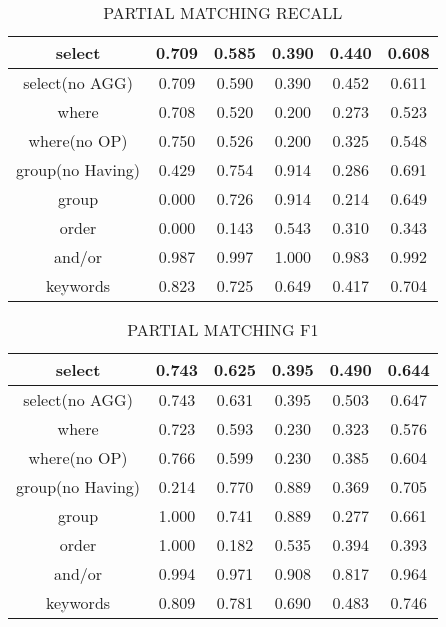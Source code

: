 \begin{table}[h!]
    \centering
    \begin{tabular}{|c|c|c|c|c|c|}
        \hline
        select           & 0.709 & 0.585 & 0.390 & 0.440 & 0.608 \\ \hline
        select(no AGG)   & 0.709 & 0.590 & 0.390 & 0.452 & 0.611 \\ \hline
        where            & 0.708 & 0.520 & 0.200 & 0.273 & 0.523 \\ \hline
        where(no OP)     & 0.750 & 0.526 & 0.200 & 0.325 & 0.548 \\ \hline
        group(no Having) & 0.429 & 0.754 & 0.914 & 0.286 & 0.691 \\ \hline
        group            & 0.000 & 0.726 & 0.914 & 0.214 & 0.649 \\ \hline
        order            & 0.000 & 0.143 & 0.543 & 0.310 & 0.343 \\ \hline
        and/or           & 0.987 & 0.997 & 1.000 & 0.983 & 0.992 \\ \hline

        keywords         & 0.823 & 0.725 & 0.649 & 0.417 & 0.704 \\ \hline
    \end{tabular}
    \caption{PARTIAL MATCHING RECALL }

\end{table}

\begin{table}[h!]
    \centering
    \begin{tabular}{|c|c|c|c|c|c|}
        \hline
        select           & 0.743 & 0.625 & 0.395 & 0.490 & 0.644 \\ \hline
        select(no AGG)   & 0.743 & 0.631 & 0.395 & 0.503 & 0.647 \\ \hline
        where            & 0.723 & 0.593 & 0.230 & 0.323 & 0.576 \\ \hline
        where(no OP)     & 0.766 & 0.599 & 0.230 & 0.385 & 0.604 \\ \hline
        group(no Having) & 0.214 & 0.770 & 0.889 & 0.369 & 0.705 \\ \hline
        group            & 1.000 & 0.741 & 0.889 & 0.277 & 0.661 \\ \hline
        order            & 1.000 & 0.182 & 0.535 & 0.394 & 0.393 \\ \hline
        and/or           & 0.994 & 0.971 & 0.908 & 0.817 & 0.964 \\ \hline

        keywords         & 0.809 & 0.781 & 0.690 & 0.483 & 0.746 \\ \hline
    \end{tabular}
    \caption{PARTIAL MATCHING F1 }
\end{table}